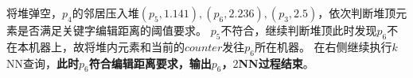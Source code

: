 \documentclass{ML}
\def\n{2} %
\def\maxxy{6} %
\begin{document}
将堆弹空，$p_4$的邻居压入堆$(p_5, 1.141), (p_6, 2.236), (p_3, 2.5)$，依次判断堆顶元素是否满足关键字编辑距离的阈值要求。
$p_5$不符合，继续判断堆顶此时发现$p_6$不在本机器上，故将堆内元素和当前的$counter$发往$p_6$所在机器。
在右侧继续执行$k$NN查询，\textbf{此时$p_6$符合编辑距离要求，输出$p_6$，$2$NN过程结束}。
\begin{figure}[H]
  \centering
\end{figure}
\end{document}
